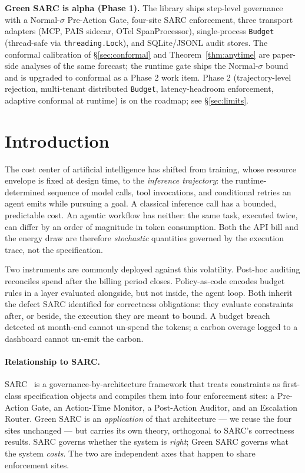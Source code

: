 \documentclass[11pt]{article}
\theoremstyle{plain}
\theoremstyle{definition}
\theoremstyle{remark}
\begin{document}
\begin{tcolorbox}[colback=black!3,colframe=black!45,title=\textbf{Status},fonttitle=\bfseries,boxrule=0.5pt]
\small \textbf{Green SARC is alpha (Phase 1).} The library ships step-level governance with a Normal-$\sigma$ Pre-Action Gate, four-site SARC enforcement, three transport adapters (MCP, PAIS sidecar, OTel SpanProcessor), single-process \texttt{Budget} (thread-safe via \texttt{threading.Lock}), and SQLite/JSONL audit stores. The conformal calibration of \S\ref{sec:conformal} and Theorem~\ref{thm:anytime} are paper-side analyses of the same forecast; the runtime gate ships the Normal-$\sigma$ bound and is upgraded to conformal as a Phase 2 work item. Phase 2 (trajectory-level rejection, multi-tenant distributed \texttt{Budget}, latency-headroom enforcement, adaptive conformal at runtime) is on the roadmap; see \S\ref{sec:limits}.
\end{tcolorbox}

\section{Introduction}

The cost center of artificial intelligence has shifted from training, whose resource envelope is fixed at design time, to the \emph{inference trajectory}: the runtime-determined sequence of model calls, tool invocations, and conditional retries an agent emits while pursuing a goal. A classical inference call has a bounded, predictable cost. An agentic workflow has neither: the same task, executed twice, can differ by an order of magnitude in token consumption. Both the API bill and the energy draw are therefore \emph{stochastic} quantities governed by the execution trace, not the specification.

Two instruments are commonly deployed against this volatility. Post-hoc auditing reconciles spend after the billing period closes. Policy-as-code encodes budget rules in a layer evaluated alongside, but not inside, the agent loop. Both inherit the defect SARC identified for correctness obligations: they evaluate constraints after, or beside, the execution they are meant to bound. A budget breach detected at month-end cannot un-spend the tokens; a carbon overage logged to a dashboard cannot un-emit the carbon.

\paragraph{Relationship to SARC.}
SARC~\cite{sarc2026} is a governance-by-architecture framework that treats constraints as first-class specification objects and compiles them into four enforcement sites: a Pre-Action Gate, an Action-Time Monitor, a Post-Action Auditor, and an Escalation Router. Green SARC is an \emph{application} of that architecture --- we reuse the four sites unchanged --- but carries its own theory, orthogonal to SARC's correctness results. SARC governs whether the system is \emph{right}; Green SARC governs what the system \emph{costs}. The two are independent axes that happen to share enforcement sites.
\end{document}
